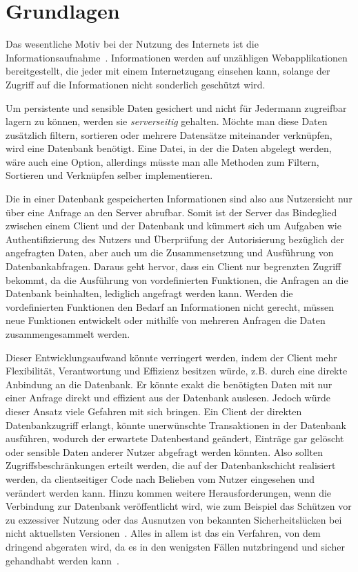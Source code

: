
\chapter{Grundlagen}
\label{sec:basics}
Das wesentliche Motiv bei der Nutzung des Internets ist die In\-for\-ma\-tions\-auf\-nah\-me~\cite{statista-1}\cite{ard-zdf}.
Informationen werden auf unzähligen Webapplikationen bereitgestellt, die jeder mit einem Internetzugang einsehen kann,
solange der Zugriff auf die Informationen nicht sonderlich geschützt wird.

Um persistente und sensible Daten gesichert und nicht für Jedermann zugreifbar lagern zu können, werden sie \emph{serverseitig} gehalten.
Möchte man diese Daten zusätzlich filtern, sortieren oder mehrere Datensätze miteinander verknüpfen, wird eine Datenbank benötigt.
Eine Datei, in der die Daten abgelegt werden, wäre auch eine Option, allerdings müsste man alle Methoden zum Filtern, Sortieren und Verknüpfen
selber implementieren.

Die in einer Datenbank gespeicherten Informationen sind also aus Nutzersicht nur über eine Anfrage an den Server abrufbar.
Somit ist der Server das Bindeglied zwischen einem Client und der Datenbank und kümmert sich um Aufgaben wie Authentifizierung des Nutzers
und Überprüfung der Autorisierung bezüglich der angefragten Daten, aber auch um die Zusammensetzung und Ausführung von Datenbankabfragen.
Daraus geht hervor, dass ein Client nur begrenzten Zugriff bekommt, da die Ausführung von vordefinierten Funktionen, die Anfragen an die Datenbank beinhalten,
lediglich angefragt werden kann. Werden die vordefinierten Funktionen den Bedarf an Informationen nicht gerecht, müssen neue Funktionen entwickelt
oder mithilfe von mehreren Anfragen die Daten zusammengesammelt werden.

Dieser Entwicklungsaufwand könnte verringert werden, indem der Client mehr Flexibilität, Verantwortung und Effizienz besitzen würde,
z.B. durch eine direkte Anbindung an die Datenbank.
Er könnte exakt die benötigten Daten mit nur einer Anfrage direkt und effizient aus der Datenbank auslesen.
Jedoch würde dieser Ansatz viele Gefahren mit sich bringen. Ein Client der direkten Datenbankzugriff erlangt,
könnte unerwünschte Transaktionen in der Datenbank ausführen, wodurch der erwartete Datenbestand geändert,
Einträge gar gelöscht oder sensible Daten anderer Nutzer abgefragt werden könnten. Also sollten Zugriffsbeschränkungen erteilt werden, die
auf der Datenbankschicht realisiert werden, da clientseitiger Code nach Belieben vom Nutzer eingesehen und verändert werden kann.
Hinzu kommen weitere Herausforderungen, wenn die Verbindung zur Datenbank veröffentlicht wird,
wie zum Beispiel das Schützen vor zu exzessiver Nutzung oder das Ausnutzen von bekannten Sicherheitslücken bei nicht aktuellsten Versionen~\cite{postgresql-security}.
Alles in allem ist das ein Verfahren, von dem dringend abgeraten wird, da es in den wenigsten Fällen nutzbringend und sicher gehandhabt werden kann~\cite{client-to-database}.

